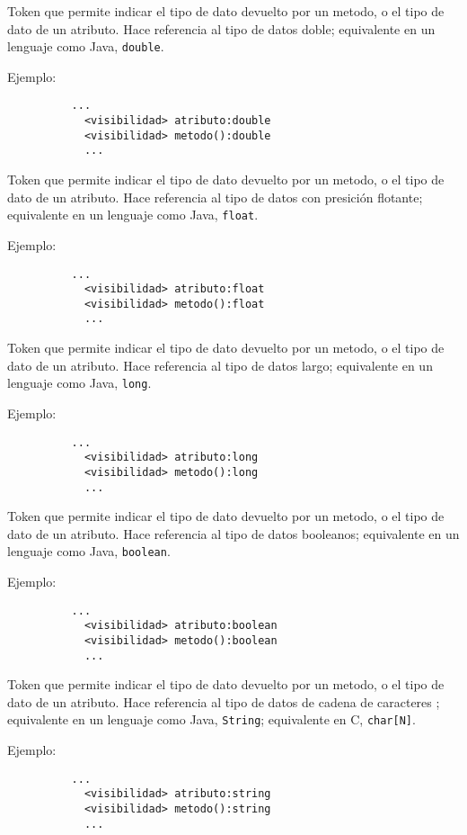 \begin{description}[align=right,labelwidth=2.5cm]
\item [double] Token que permite indicar el tipo de dato devuelto por un metodo, o
	el tipo de dato de un atributo. Hace referencia al tipo de
	datos doble; equivalente en un lenguaje como Java, \texttt{double}.

	Ejemplo:
		\begin{lstlisting}
		  ...
			<visibilidad> atributo:double
			<visibilidad> metodo():double
			...
		\end{lstlisting}

\item [float] Token que permite indicar el tipo de dato devuelto por un metodo, o
	el tipo de dato de un atributo. Hace referencia al tipo de
	datos con presición flotante; equivalente en un lenguaje como Java,
	\texttt{float}.

	Ejemplo:
		\begin{lstlisting}
		  ...
			<visibilidad> atributo:float
			<visibilidad> metodo():float
			...
		\end{lstlisting}

\item [long] Token que permite indicar el tipo de dato devuelto por un metodo, o
	el tipo de dato de un atributo. Hace referencia al tipo de
	datos largo; equivalente en un lenguaje como Java, \texttt{long}.

	Ejemplo:
		\begin{lstlisting}
		  ...
			<visibilidad> atributo:long
			<visibilidad> metodo():long
			...
		\end{lstlisting}

\item [boolean] Token que permite indicar el tipo de dato devuelto por un metodo, o
	el tipo de dato de un atributo. Hace referencia al tipo de
	datos booleanos; equivalente en un lenguaje como Java, \texttt{boolean}.

	Ejemplo:
		\begin{lstlisting}
		  ...
			<visibilidad> atributo:boolean
			<visibilidad> metodo():boolean
			...
		\end{lstlisting}

\item [string] Token que permite indicar el tipo de dato devuelto por un metodo, o
	el tipo de dato de un atributo. Hace referencia al tipo de
	datos de cadena de caracteres ; equivalente en un lenguaje como Java, \texttt{String};
	equivalente en C, \texttt{char[N]}.

	Ejemplo:
		\begin{lstlisting}
		  ...
			<visibilidad> atributo:string
			<visibilidad> metodo():string
			...
		\end{lstlisting}


\end{description}
